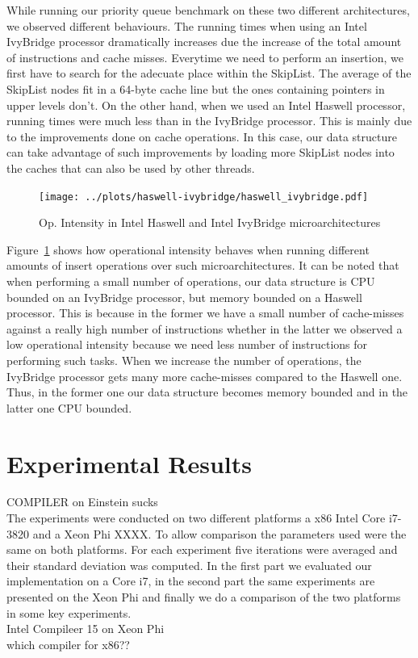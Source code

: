 While running our priority queue benchmark on these two different architectures, we observed different behaviours. The running times when using an Intel IvyBridge processor dramatically increases due the increase of the total amount of instructions and cache misses. Everytime we need to perform an insertion, we first have to search for the adecuate place within the SkipList. The average of the SkipList nodes fit in a 64-byte cache line but the ones containing pointers in upper levels don't. On the other hand, when we used an Intel Haswell processor, running times were much less than in the IvyBridge processor. This is mainly due to the improvements done on cache operations. In this case, our data structure can take advantage of such improvements by loading more SkipList nodes into the caches that can also be used by other threads.

\begin{figure}[t]
	\centering
	\texttt{[image: ../plots/haswell-ivybridge/haswell\_ivybridge.pdf]}
	\caption{Op. Intensity in Intel Haswell and Intel IvyBridge microarchitectures}
	\label{fig:haswell_ivybridge}
\end{figure}

Figure~\ref{fig:haswell_ivybridge} shows how operational intensity behaves when running different amounts of insert operations over such microarchitectures. It can be noted that when performing a small number of operations, our data structure is CPU bounded on an IvyBridge processor, but memory bounded on a Haswell processor. This is because in the former we have a small number of cache-misses against a really high number of instructions whether in the latter we observed a low operational intensity because we need less number of instructions for performing such tasks. When we increase the number of operations, the IvyBridge processor gets many more cache-misses compared to the Haswell one. Thus, in the former one our data structure becomes memory bounded and in the latter one CPU bounded.
\section{Experimental Results}
COMPILER on Einstein sucks\\
The experiments were conducted on two different platforms a x86 Intel Core i7-3820 and a Xeon Phi XXXX. To allow comparison the parameters used were the same on both platforms. For each experiment five iterations were averaged and their standard deviation was computed. In the first part we evaluated our implementation on a Core i7, in the second part the same experiments are presented on the Xeon Phi and finally we do a comparison of the two platforms in some key experiments.\\
Intel Compileer 15 on Xeon Phi\\
which compiler for x86??
